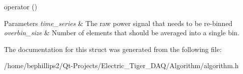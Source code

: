 operator () 


\begin{DoxyParams}{Parameters}
{\em time\+\_\+series} & The raw power signal that needs to be re-\/binned\\
\hline
{\em overbin\+\_\+size} & Number of elements that should be averaged into a single bin. \\
\hline
\end{DoxyParams}


The documentation for this struct was generated from the following file\+:\begin{DoxyCompactItemize}
\item 
/home/bephillips2/\+Qt-\/\+Projects/\+Electric\+\_\+\+Tiger\+\_\+\+D\+A\+Q/\+Algorithm/algorithm.\+h\end{DoxyCompactItemize}
